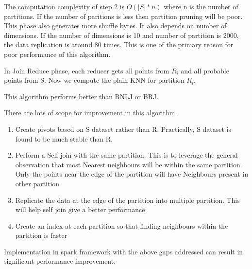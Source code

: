 \documentclass[conference]{IEEEtran}
\begin{document}
The computation complexity of step 2 is $O(|S| * n)$ where n is the
number of partitions. If the number of paritions is less then
partition pruning will be poor. This phase also generates more shuffle
bytes. It also depends on number of dimensions. If the number of
dimensions is 10 and number of partition is 2000, the data replication
is around 80 times. This is one of the primary reason for poor
performance of this algorithm.

\bigskip

In Join Reduce phase, each reducer gets all points from $R_i$ and all
probable points from S. Now we compute the plain KNN for partition
$R_i$.

\medskip

This algorithm performs better than BNLJ or BRJ.

\bigskip

There are lots of scope for improvement in this algorithm.
\begin{enumerate}
\item Create pivots based on S dataset rather than R. Practically, S
  dataset is found to be much stable than R.
\item Perform a Self join with the same partition. This is to leverage
  the general observation that most Nearest neighbours will be within
  the same partition. Only the points near the edge of the partition
  will have Neighbours present in other partition
\item Replicate the data at the edge of the partition into multiple
  partition. This will help self join give a better performance
\item Create an index at each partition so that finding neighbours
  within the partition is faster
\end{enumerate}

Implementation in spark framework with the above gaps addressed can
result in significant performance improvement.

%
%
\end{document}
